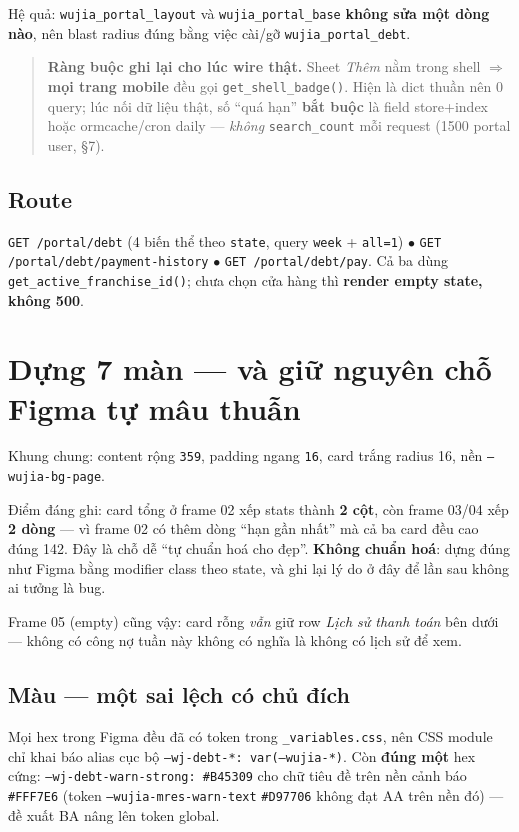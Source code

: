 Hệ quả: \texttt{wujia\_portal\_layout} và \texttt{wujia\_portal\_base} \textbf{không sửa một dòng
nào}, nên blast radius đúng bằng việc cài/gỡ \texttt{wujia\_portal\_debt}.

\begin{quote}
\textbf{Ràng buộc ghi lại cho lúc wire thật.} Sheet \emph{Thêm} nằm trong shell $\Rightarrow$
\textbf{mọi trang mobile} đều gọi \texttt{get\_shell\_badge()}. Hiện là dict thuần nên 0 query;
lúc nối dữ liệu thật, số ``quá hạn'' \textbf{bắt buộc} là field store+index hoặc
ormcache/cron daily --- \emph{không} \texttt{search\_count} mỗi request (1500 portal user, §7).
\end{quote}

\subsection{Route}

\texttt{GET /portal/debt} (4 biến thể theo \texttt{state}, query \texttt{week} + \texttt{all=1}) $\bullet$
\texttt{GET /portal/debt/payment-history} $\bullet$ \texttt{GET /portal/debt/pay}. Cả ba dùng
\texttt{get\_active\_franchise\_id()}; chưa chọn cửa hàng thì \textbf{render empty state, không 500}.

\section{Dựng 7 màn --- và giữ nguyên chỗ Figma tự mâu thuẫn}

Khung chung: content rộng \texttt{359}, padding ngang \texttt{16}, card trắng radius 16, nền
\texttt{--wujia-bg-page}.

Điểm đáng ghi: card tổng ở frame 02 xếp stats thành \textbf{2 cột}, còn frame 03/04 xếp \textbf{2
dòng} --- vì frame 02 có thêm dòng ``hạn gần nhất'' mà cả ba card đều cao đúng 142. Đây là chỗ dễ
``tự chuẩn hoá cho đẹp''. \textbf{Không chuẩn hoá}: dựng đúng như Figma bằng modifier class theo
state, và ghi lại lý do ở đây để lần sau không ai tưởng là bug.

Frame 05 (empty) cũng vậy: card rỗng \emph{vẫn} giữ row \emph{Lịch sử thanh toán} bên dưới --- không
có công nợ tuần này không có nghĩa là không có lịch sử để xem.

\subsection{Màu --- một sai lệch có chủ đích}

Mọi hex trong Figma đều đã có token trong \texttt{\_variables.css}, nên CSS module chỉ khai báo alias
cục bộ \texttt{--wj-debt-*: var(--wujia-*)}. Còn \textbf{đúng một} hex cứng:
\texttt{--wj-debt-warn-strong: \#B45309} cho chữ tiêu đề trên nền cảnh báo \texttt{\#FFF7E6}
(token \texttt{--wujia-mres-warn-text} \texttt{\#D97706} không đạt AA trên nền đó) --- đề xuất BA
nâng lên token global.

